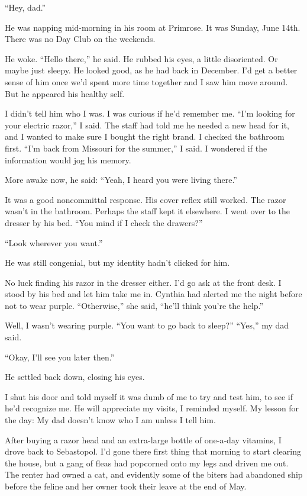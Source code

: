 \documentclass[12pt]{book}
\begin{document}
``Hey, dad.''

He was napping mid-morning in his room at Primrose. It was Sunday, June 14th. There was no Day Club on the weekends.

He woke. ``Hello there,'' he said. He rubbed his eyes, a little disoriented. Or maybe just sleepy. He looked good, as he had back in December. I'd get a better sense of him once we'd spent more time together and I saw him move around. But he appeared his healthy self.

I didn't tell him who I was. I was curious if he'd remember me. ``I'm looking for your electric razor,'' I said. The staff had told me he needed a new head for it, and I wanted to make sure I bought the right brand. I checked the bathroom first. ``I'm back from Missouri for the summer,'' I said. I wondered if the information would jog his memory.

More awake now, he said: ``Yeah, I heard you were living there.''

It was a good noncommittal response. His cover reflex still worked. The razor wasn't in the bathroom. Perhaps the staff kept it elsewhere. I went over to the dresser by his bed. ``You mind if I check the drawers?''

``Look wherever you want.'' 

He was still congenial, but my identity hadn't clicked for him.

No luck finding his razor in the dresser either. I'd go ask at the front desk. I stood by his bed and let him take me in. Cynthia had alerted me the night before not to wear purple. ``Otherwise,'' she said, ``he'll think you're the help.''

Well, I wasn't wearing purple. ``You want to go back to sleep?'' ``Yes,'' my dad said.

``Okay, I'll see you later then.''

He settled back down, closing his eyes.

I shut his door and told myself it was dumb of me to try and test him, to see if he'd recognize me. He will appreciate my visits, I reminded myself. My lesson for the day: My dad doesn't know who I am unless I tell him.

After buying a razor head and an extra-large bottle of one-a-day vitamins, I drove back to Sebastopol. I'd gone there first thing that morning to start clearing the house, but a gang of fleas had popcorned onto my legs and driven me out. The renter had owned a cat, and evidently some of the biters had abandoned ship before the feline and her owner took their leave at the end of May.
\end{document}
